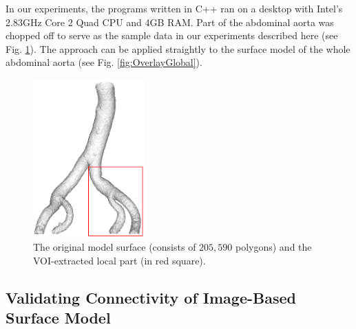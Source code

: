 In our experiments, the programs written in C++ ran on a desktop with Intel's 2.83GHz Core 2 Quad CPU and 4GB RAM.
Part of the abdominal aorta was chopped off to serve as the sample data in our experiments described here (see Fig. \ref{fig:VOI}). %
The approach can be applied straightly to the surface model of the whole abdominal aorta (see Fig. \ref{fig:OverlayGlobal}). %
\begin{figure}[t]
\centering
\includegraphics[height=2.4in]{Figures/chap05/VOI.png}
\caption{The original model surface (consists of $205,590$ polygons) and the VOI-extracted local part (in red square).}
\label{fig:VOI}
\end{figure}


\subsection{Validating Connectivity of Image-Based Surface Model}

